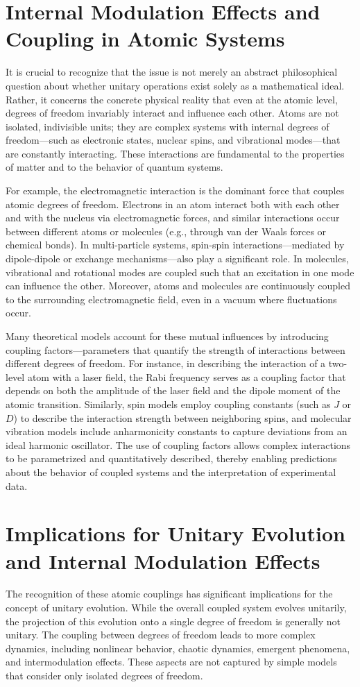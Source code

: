 \documentclass[12pt]{article}
\begin{document}
	\section{Internal Modulation Effects and Coupling in Atomic Systems}
	It is crucial to recognize that the issue is not merely an abstract philosophical question about whether unitary operations exist solely as a mathematical ideal. Rather, it concerns the concrete physical reality that even at the atomic level, degrees of freedom invariably interact and influence each other. Atoms are not isolated, indivisible units; they are complex systems with internal degrees of freedom—such as electronic states, nuclear spins, and vibrational modes—that are constantly interacting. These interactions are fundamental to the properties of matter and to the behavior of quantum systems.
	
	For example, the electromagnetic interaction is the dominant force that couples atomic degrees of freedom. Electrons in an atom interact both with each other and with the nucleus via electromagnetic forces, and similar interactions occur between different atoms or molecules (e.g., through van der Waals forces or chemical bonds). In multi-particle systems, spin-spin interactions—mediated by dipole-dipole or exchange mechanisms—also play a significant role. In molecules, vibrational and rotational modes are coupled such that an excitation in one mode can influence the other. Moreover, atoms and molecules are continuously coupled to the surrounding electromagnetic field, even in a vacuum where fluctuations occur.
	
	Many theoretical models account for these mutual influences by introducing coupling factors—parameters that quantify the strength of interactions between different degrees of freedom. For instance, in describing the interaction of a two-level atom with a laser field, the Rabi frequency serves as a coupling factor that depends on both the amplitude of the laser field and the dipole moment of the atomic transition. Similarly, spin models employ coupling constants (such as \(J\) or \(D\)) to describe the interaction strength between neighboring spins, and molecular vibration models include anharmonicity constants to capture deviations from an ideal harmonic oscillator. The use of coupling factors allows complex interactions to be parametrized and quantitatively described, thereby enabling predictions about the behavior of coupled systems and the interpretation of experimental data.
	
	\section{Implications for Unitary Evolution and Internal Modulation Effects}
	The recognition of these atomic couplings has significant implications for the concept of unitary evolution. While the overall coupled system evolves unitarily, the projection of this evolution onto a single degree of freedom is generally not unitary. The coupling between degrees of freedom leads to more complex dynamics, including nonlinear behavior, chaotic dynamics, emergent phenomena, and intermodulation effects. These aspects are not captured by simple models that consider only isolated degrees of freedom.
	
\end{document}
